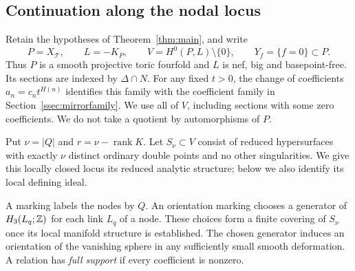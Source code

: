 \subsection{Continuation along the nodal locus}\label{ssec:componentwise}

Retain the hypotheses of Theorem~\ref{thm:main}, and write
\[
 P=X_{\mathcal T},\qquad L=-K_P,\qquad
 V=H^0(P,L)\setminus\{0\},\qquad Y_f=\{f=0\}\subset P.
\]
Thus $P$ is a smooth projective toric fourfold and $L$ is nef, big and
basepoint-free. Its sections are indexed by $\Delta\cap N$.
For any fixed $t>0$, the change of coefficients
$a_n=c_nt^{H(n)}$ identifies this family with the coefficient family in
Section~\ref{ssec:mirrorfamily}. We use all of $V$, including sections with some zero coefficients.
We do not take a quotient by automorphisms of $P$.

Put $\nu=|Q|$ and $r=\nu-\operatorname{rank}K$. Let $S_\nu\subset V$ consist of reduced
hypersurfaces with exactly $\nu$ distinct ordinary double points and no
other singularities. We give this locally closed locus its reduced
analytic structure; below we also identify its local defining ideal.

A marking labels the nodes by $Q$. An orientation marking chooses a
generator of $H_3(L_q;\mathbb Z)$ for each link $L_q$ of a node. These choices
form a finite covering of $S_\nu$ once its local manifold structure is
established. The chosen generator induces an orientation of the vanishing
sphere in any sufficiently small smooth deformation.
A relation has \emph{full support} if every coefficient is nonzero.

